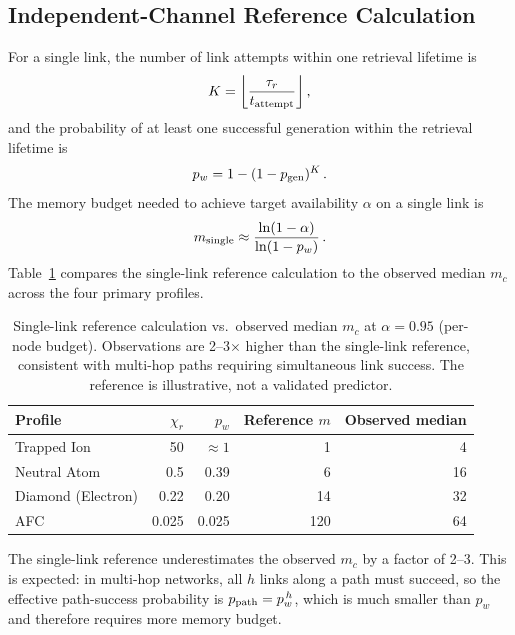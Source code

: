 \documentclass[quantumrep,article,submit,moreauthors]{Definitions/mdpi}
\begin{document}
\subsection{Independent-Channel Reference Calculation}

For a single link, the number of link attempts within one retrieval lifetime is
\begin{equation}
K = \left\lfloor \frac{\tau_r}{t_{\rm attempt}} \right\rfloor \,,
\end{equation}
and the probability of at least one successful generation within the retrieval lifetime is
\begin{equation}
p_w = 1 - (1 - p_{\rm gen})^{K} \,.
\end{equation}
The memory budget needed to achieve target availability $\alpha$ on a single link is
\begin{equation}
m_{\rm single} \approx \frac{\ln(1-\alpha)}{\ln(1 - p_w)} \,.
\end{equation}
Table~\ref{tab:chi_single} compares the single-link reference calculation to the observed median $m_c$ across the four primary profiles.

\begin{table}[htbp]
\centering
\caption{Single-link reference calculation vs.\ observed median $m_c$ at $\alpha=0.95$ (per-node budget). Observations are 2--3$\times$ higher than the single-link reference, consistent with multi-hop paths requiring simultaneous link success. The reference is illustrative, not a validated predictor.}
\label{tab:chi_single}
\begin{tabular}{lrrrr}
\toprule
Profile & $\chi_r$ & $p_w$ & Reference $m$ & Observed median \\
\midrule
Trapped Ion & 50 & $\approx 1$ & 1 & 4 \\
Neutral Atom & 0.5 & 0.39 & 6 & 16 \\
Diamond (Electron) & 0.22 & 0.20 & 14 & 32 \\
AFC & 0.025 & 0.025 & 120 & 64 \\
\bottomrule
\end{tabular}
\end{table}

The single-link reference underestimates the observed $m_c$ by a factor of 2--3. This is expected: in multi-hop networks, all $h$ links along a path must succeed, so the effective path-success probability is $p_{\rm path} = p_w^{\,h}$, which is much smaller than $p_w$ and therefore requires more memory budget.
\end{document}
